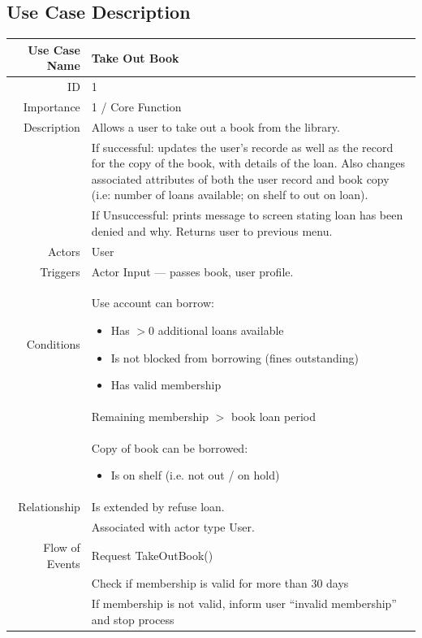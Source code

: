 \subsection{Use Case Description}
\begingroup
\def\arraystretch{1.5}
\begin{longtabu}{|r|X|}
    \hline
    Use Case Name & Take Out Book \\\hline
    ID & 1 \\\hline
    Importance & 1 / Core Function \\\hline
    Description & Allows a user to take out a book from the library. \\
    & If successful: updates the user’s recorde as well as the record for the copy of the book, with details of the loan. Also changes associated attributes of both the user record and book copy (i.e: number of loans available; on shelf to out on loan). \\
    & If Unsuccessful: prints message to screen stating loan has been denied and why. Returns user to previous menu. \\\hline
    Actors & User \\\hline
    Triggers & Actor Input --- passes book, user profile. \\\hline
    Conditions & Use account can borrow: \begin{itemize}
        \item Has $>0$ additional loans available
        \item Is not blocked from borrowing (fines outstanding)
        \item Has valid membership
    \end{itemize} \\
    & Remaining membership $>$ book loan period\\
    & Copy of book can be borrowed:\begin{itemize}
        \item Is on shelf (i.e. not out / on hold)
    \end{itemize} \\\hline
    Relationship & Is extended by refuse loan. \\
    & Associated with actor type User. \\\hline
    Flow of Events & Request TakeOutBook() \\
    & Check if membership is valid for more than 30 days \\
    & If membership is not valid, inform user ``invalid membership'' and stop process \\

\end{longtabu}
